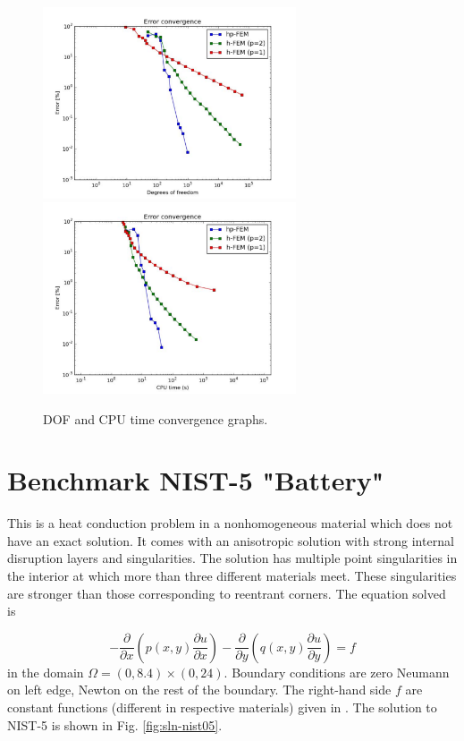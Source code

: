 \documentclass[12pt]{elsarticle}
\begin{document}
\begin{figure}[H]
\centering
\hspace{-50mm}
\includegraphics[width=7.5cm]{mafig27.pdf}\ \
\hspace{-10mm}
\includegraphics[width=7.5cm]{mafig28.pdf}
\hspace{-50mm}
\vspace{-2mm}
\caption{DOF and CPU time convergence graphs.}
\label{fig:nist-4-conv}
\end{figure}


\section{Benchmark NIST-5 "Battery"}
\label{sec:bench-5}

This is a heat conduction problem in a nonhomogeneous material
which does not have an exact solution.
It comes with an anisotropic solution with strong internal disruption
layers and singularities.
The solution has multiple point singularities in the interior at which
more than three different materials meet. These singularities are stronger than those
corresponding to reentrant corners. The equation solved is

\begin{equation} \label{heat-conduction}
-\frac{\partial }{\partial x}\left(p(x, y)\frac{\partial u}{\partial x}\right)
-\frac{\partial }{\partial y}\left(q(x, y)\frac{\partial u}{\partial y}\right) = f
\end{equation}
in the domain $\Omega = (0, 8.4) \times (0, 24)$. Boundary conditions are zero Neumann on left edge, Newton on the rest of the boundary.
The right-hand side $f$ are constant functions (different in respective materials) given in \cite{mitchell-1}.
The solution to NIST-5 is shown in Fig. \ref{fig:sln-nist05}.
\end{document}
